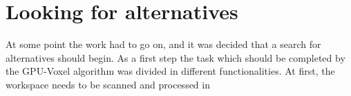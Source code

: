 \chapter{Looking for alternatives}
\label{chap:alternatives}

At some point the work had to go on, and it was decided that a search for alternatives should begin. As a first step the task which should be completed by the GPU-Voxel algorithm was divided in different functionalities. At first, the workspace needs to be scanned and processed in
